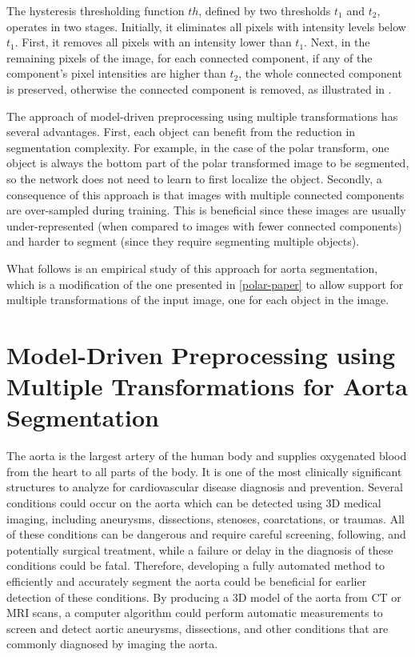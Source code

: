 The hysteresis thresholding function \(th\), defined by two thresholds \(t_1\) and \(t_2\), operates in two stages. Initially, it eliminates all pixels with intensity levels below \(t_1\). First, it removes all pixels with an intensity lower than $t_1$. Next, in the remaining pixels of the image, for each connected component, if any of the component's pixel intensities are higher than $t_2$, the whole connected component is preserved, otherwise the connected component is removed, as illustrated in .
	
The approach of model-driven preprocessing using multiple transformations has several advantages. First, each object can benefit from the reduction in segmentation complexity. For example, in the case of the polar transform, one object is always the bottom part of the polar transformed image to be segmented, so the network does not need to learn to first localize the object. Secondly, a consequence of this approach is that images with multiple connected components are over-sampled during training. This is beneficial since these images are usually under-represented (when compared to images with fewer connected components) and harder to segment (since they require segmenting multiple objects).
	
What follows is an empirical study of this approach for aorta segmentation, which is a modification of the one presented in \ref{polar-paper} to allow support for multiple transformations of the input image, one for each object in the image.

\section{Model-Driven Preprocessing using Multiple Transformations for Aorta Segmentation}

The aorta is the largest artery of the human body and supplies oxygenated blood from the heart to all parts of the body. It is one of the most clinically significant structures to analyze for cardiovascular disease diagnosis and prevention. Several conditions could occur on the aorta which can be detected using 3D medical imaging, including aneurysms, dissections, stenoses, coarctations, or traumas. All of these conditions can be dangerous and require careful screening, following, and potentially surgical treatment, while a failure or delay in the diagnosis of these conditions could be fatal. Therefore, developing a fully automated method to efficiently and accurately segment the aorta could be beneficial for earlier detection of these conditions. By producing a 3D model of the aorta from CT or MRI scans, a computer algorithm could perform automatic measurements to screen and detect aortic aneurysms, dissections, and other conditions that are commonly diagnosed by imaging the aorta.


